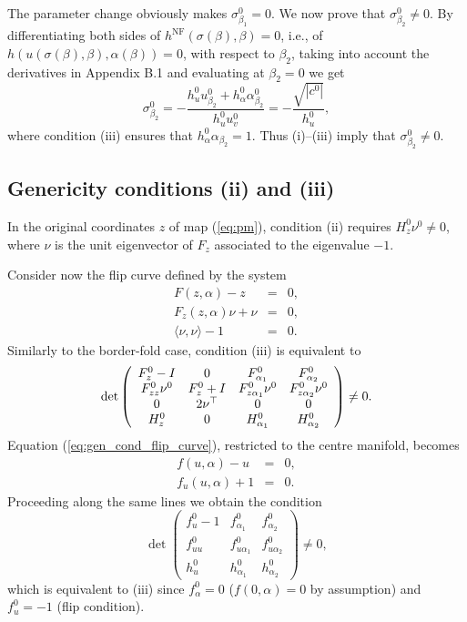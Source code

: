 \documentclass[final,onefignum]{siamltex}
\begin{document}
The parameter change obviously makes $\sigma_{\beta_1}^0=0$.  We now prove that $\sigma_{\beta_2}^0\neq 0$.  By differentiating both sides of $h^{\mathrm{NF}}(\sigma(\beta),\beta)=0$,
i.e., of $h(u(\sigma(\beta),\beta),\alpha(\beta))=0$,
with respect to $\beta_2$, taking into account the derivatives in Appendix B.1 and evaluating at $\beta_2=0$ we get
$$
\sigma_{\beta_2}^0=
-{\displaystyle \frac{\displaystyle {h_u^0u_{\beta_2}^0+h_{\alpha}^0\alpha_{\beta_2}^0}}{\displaystyle {h_u^0 u_{v}^0}}}=
-{\displaystyle \frac{\displaystyle {\sqrt{|c^0|}}}{\displaystyle {h_u^0}}},
$$
where condition (iii) ensures that $h_{\alpha}^0 \alpha_{\beta_2}=1$.  Thus (i)--(iii) imply that $\sigma_{\beta_2}^0\neq 0$.

\subsection{Genericity conditions (ii) and (iii)}
In the original coordinates $z$ of map (\ref{eq:pm}), condition (ii) requires $H_z^0\nu^0\neq0$, where $\nu$ is the unit eigenvector of $F_z$ associated to the eigenvalue $-1$. 

Consider now the flip curve defined by the system
\begin{equation}
\label{eq:gen_cond_flip_curve}
\begin{array}{rcl}
 F(z,\alpha)-z & = & 0,\\
 F_z(z,\alpha)\nu + \nu & = & 0,\\
 \langle \nu,\nu\rangle-1 & = & 0.
\end{array}
\end{equation}
Similarly to the border-fold case, condition (iii) is equivalent to
$$
\det
\left(
\begin{array}{cccc}
F^0_z-I & 0 & F^0_{\alpha_1} & F^0_{\alpha_2}\\
F_{zz}^0\nu^0 & F^0_z+I &  F_{z\alpha_1}^0\nu^0 & F_{z\alpha_2}^0\nu^0\\
0 & 2\nu{^{{\scriptscriptstyle}\top}} & 0 & 0\\
H^0_z & 0 & H^0_{\alpha_1} & H^0_{\alpha_2}
\end{array}
\right)\neq 0.
$$
Equation (\ref{eq:gen_cond_flip_curve}), restricted to the centre manifold, becomes
$$
\begin{array}{rcl}
 f(u,\alpha)-u & = & 0,\\
 f_u(u,\alpha) + 1 & = & 0.
\end{array}
$$
Proceeding along the same lines we obtain the condition 
$$
\det
\left(
\begin{array}{ccc}
f^0_u-1 & f^0_{\alpha_1} & f^0_{\alpha_2} \\
f^0_{uu} & f^0_{u\alpha_1} & f^0_{u\alpha_2}\\
h^0_u & h^0_{\alpha_1} & h^0_{\alpha_2}
\end{array}
\right)\neq 0,
$$
which is equivalent to (iii) since $f^0_\alpha=0$ ($f(0,\alpha)=0$ by assumption) and $f^0_u=-1$ (flip condition).
\end{document}
